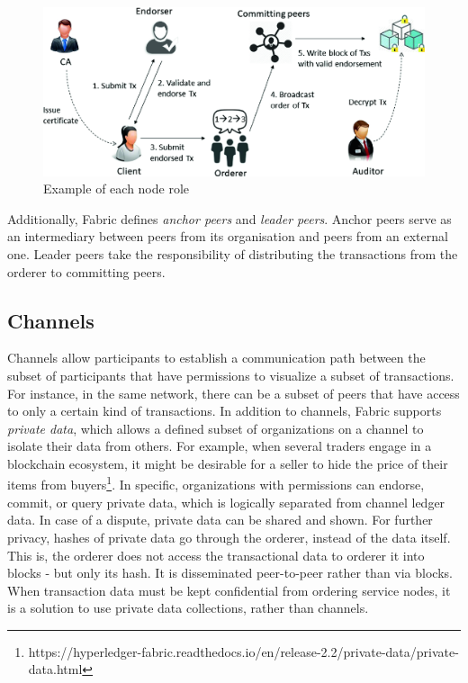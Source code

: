 \documentclass[12pt,a4paper]{article}
\theoremstyle{definition}
\begin{document}
\begin{figure}[h]

    \includegraphics[scale=1]{figures/peer_nodes.png}
    \centering
 \caption{Example of each node role \cite{peer_nodes}}
    \label{fig:hf}
\end{figure}

Additionally, Fabric defines \emph{anchor peers} and \emph{leader peers}. Anchor peers serve as an intermediary between peers from its organisation and peers from an external one. Leader peers take the responsibility of distributing the transactions from the orderer to committing peers. 


\subsection{Channels}
Channels allow participants to establish a communication path between the subset of participants that have permissions to visualize a subset of transactions. For instance, in the same network, there can be a subset of peers that have access to only a certain kind of transactions.  In addition to channels, Fabric supports \textit{private data}, which allows a defined subset of organizations on a channel to isolate their data from others. For example, when several traders engage in a blockchain ecosystem, it might be desirable for a seller to hide the price of their items from buyers\footnote{https://hyperledger-fabric.readthedocs.io/en/release-2.2/private-data/private-data.html}. In specific, organizations with permissions can endorse, commit, or query private data, which is logically separated from channel ledger data.  In case of a dispute, private data can be shared and shown. For further privacy, hashes of private data go through the orderer, instead of the data itself. This is, the orderer does not access the transactional data to orderer it into blocks - but only its hash. It is disseminated peer-to-peer rather than via blocks. When transaction data must be kept confidential from ordering service nodes, it is a solution to use private data collections, rather than channels. 
\end{document}
